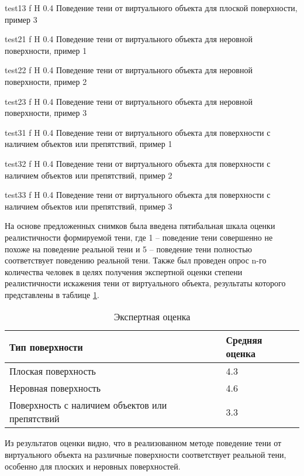 {test13}
{f}
{H}
{0.4\textwidth}
{Поведение тени от виртуального объекта для плоской поверхности, пример 3}

{test21}
{f}
{H}
{0.4\textwidth}
{Поведение тени от виртуального объекта для неровной поверхности, пример 1}

{test22}
{f}
{H}
{0.4\textwidth}
{Поведение тени от виртуального объекта для неровной поверхности, пример 2}

{test23}
{f}
{H}
{0.4\textwidth}
{Поведение тени от виртуального объекта для неровной поверхности, пример 3}

{test31}
{f}
{H}
{0.4\textwidth}
{Поведение тени от виртуального объекта для поверхности с наличием объектов или препятствий, пример 1}

{test32}
{f}
{H}
{0.4\textwidth}
{Поведение тени от виртуального объекта для поверхности с наличием объектов или препятствий, пример 2}

{test33}
{f}
{H}
{0.4\textwidth}
{Поведение тени от виртуального объекта для поверхности с наличием объектов или препятствий, пример 3}

На основе предложенных снимков была введена пятибальная шкала оценки реалистичности формируемой тени, где 1 -- поведение тени совершенно не похоже на поведение реальной тени и 5 -- поведение тени полностью соответствует поведению реальной тени. Также был проведен опрос n-го количества человек в целях получения экспертной оценки степени реалистичности искажения тени от виртуального объекта, результаты которого представлены в таблице \ref{Otsenka}.

\begin{table}[H]
	\caption{Экспертная оценка}
	\label{Otsenka}
	\begin{center}
		\begin{tabular}{| p{8 cm} | p{3.5 cm} |} 
			\hline
			Тип поверхности & Средняя оценка \\
			\hline
			Плоская поверхность & 4.3 \\
			\hline
			Неровная поверхность & 4.6 \\
			\hline
			Поверхность с наличием объектов или препятствий & 3.3 \\
			\hline
		\end{tabular}
	\end{center}
\end{table}

Из результатов оценки видно, что в реализованном методе поведение тени от виртуального объекта на различные поверхности соответствует реальной тени, особенно для плоских и неровных поверхностей.

